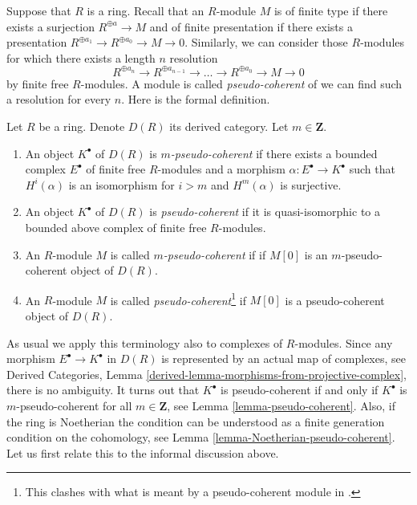 \noindent
Suppose that $R$ is a ring. Recall that an $R$-module $M$ is of finite type
if there exists a surjection $R^{\oplus a} \to M$ and of finite presentation
if there exists a presentation
$R^{\oplus a_1} \to R^{\oplus a_0} \to M \to 0$.
Similarly, we can consider those $R$-modules for which there exists
a length $n$ resolution
\begin{equation}
\label{equation-pseudo-coherent}
R^{\oplus a_n} \to R^{\oplus a_{n - 1}} \to \ldots \to R^{\oplus a_0} \to
M \to 0
\end{equation}
by finite free $R$-modules. A module is called {\it pseudo-coherent}
of we can find such a resolution for every $n$. Here is the formal
definition.

\begin{definition}
\label{definition-pseudo-coherent}
Let $R$ be a ring. Denote $D(R)$ its derived category.
Let $m \in \mathbf{Z}$.
\begin{enumerate}
\item An object $K^\bullet$ of $D(R)$ is {\it $m$-pseudo-coherent}
if there exists a bounded complex $E^\bullet$ of finite free $R$-modules
and a morphism $\alpha : E^\bullet \to K^\bullet$ such that
$H^i(\alpha)$ is an isomorphism for $i > m$ and $H^m(\alpha)$
is surjective.
\item An object $K^\bullet$ of $D(R)$ is {\it pseudo-coherent}
if it is quasi-isomorphic to a bounded above complex of finite
free $R$-modules.
\item An $R$-module $M$ is called {\it $m$-pseudo-coherent} if
if $M[0]$ is an $m$-pseudo-coherent object of $D(R)$.
\item An $R$-module $M$ is called
{\it pseudo-coherent}\footnote{This clashes with what is meant by
a pseudo-coherent module in \cite{Bourbaki-CA}.}
if $M[0]$ is a pseudo-coherent object of $D(R)$.
\end{enumerate}
\end{definition}

\noindent
As usual we apply this terminology also to complexes of $R$-modules.
Since any morphism $E^\bullet \to K^\bullet$ in $D(R)$ is represented
by an actual map of complexes, see
Derived Categories, Lemma \ref{derived-lemma-morphisms-from-projective-complex},
there is no ambiguity.
It turns out that $K^\bullet$ is pseudo-coherent if and only if
$K^\bullet$ is $m$-pseudo-coherent for all $m \in \mathbf{Z}$, see
Lemma \ref{lemma-pseudo-coherent}.
Also, if the ring is Noetherian the condition can be understood
as a finite generation condition on the cohomology, see
Lemma \ref{lemma-Noetherian-pseudo-coherent}.
Let us first relate this to the informal discussion above.

